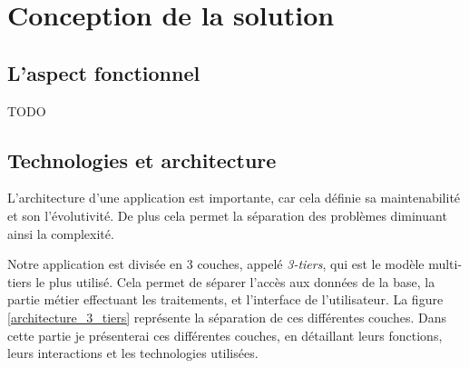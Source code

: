 \cleardoublepage

\chapter{Conception de la solution}


\section{L'aspect fonctionnel}

TODO


\section{Technologies et architecture}

L'architecture d'une application est importante, car cela définie sa maintenabilité et son l'évolutivité. De plus cela permet la séparation des problèmes diminuant ainsi la complexité.

Notre application est divisée en 3 couches, appelé \textit{3-tiers}, qui est le modèle multi-tiers le plus utilisé. Cela permet de séparer l'accès aux données de la base, la partie métier effectuant les traitements, et l'interface de l'utilisateur. La figure \ref{architecture_3_tiers} représente la séparation de ces différentes couches. Dans cette partie je présenterai ces différentes couches, en détaillant leurs fonctions, leurs interactions et les technologies utilisées.
~~\\

